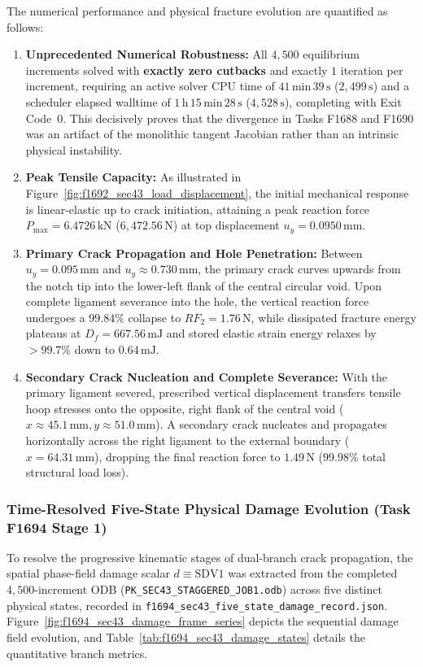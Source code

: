 The numerical performance and physical fracture evolution are quantified as follows:
\begin{enumerate}
  \item \textbf{Unprecedented Numerical Robustness:} All $4{,}500$ equilibrium increments solved with \textbf{exactly zero cutbacks} and exactly $1$ iteration per increment, requiring an active solver CPU time of $41\,\mathrm{min}\,39\,\mathrm{s}$ ($2{,}499\,\mathrm{s}$) and a scheduler elapsed walltime of $1\,\mathrm{h}\,15\,\mathrm{min}\,28\,\mathrm{s}$ ($4{,}528\,\mathrm{s}$), completing with Exit Code~0. This decisively proves that the divergence in Tasks F1688 and F1690 was an artifact of the monolithic tangent Jacobian rather than an intrinsic physical instability.
  \item \textbf{Peak Tensile Capacity:} As illustrated in Figure~\ref{fig:f1692_sec43_load_displacement}, the initial mechanical response is linear-elastic up to crack initiation, attaining a peak reaction force $P_{\max} = 6.4726\,\mathrm{kN}$ ($6{,}472.56\,\mathrm{N}$) at top displacement $u_y = 0.0950\,\mathrm{mm}$.
  \item \textbf{Primary Crack Propagation and Hole Penetration:} Between $u_y = 0.095\,\mathrm{mm}$ and $u_y \approx 0.730\,\mathrm{mm}$, the primary crack curves upwards from the notch tip into the lower-left flank of the central circular void. Upon complete ligament severance into the hole, the vertical reaction force undergoes a $99.84\%$ collapse to $RF_2 = 1.76\,\mathrm{N}$, while dissipated fracture energy plateaus at $D_f = 667.56\,\mathrm{mJ}$ and stored elastic strain energy relaxes by $>99.7\%$ down to $0.64\,\mathrm{mJ}$.
  \item \textbf{Secondary Crack Nucleation and Complete Severance:} With the primary ligament severed, prescribed vertical displacement transfers tensile hoop stresses onto the opposite, right flank of the central void ($x \approx 45.1\,\mathrm{mm}, y \approx 51.0\,\mathrm{mm}$). A secondary crack nucleates and propagates horizontally across the right ligament to the external boundary ($x = 64.31\,\mathrm{mm}$), dropping the final reaction force to $1.49\,\mathrm{N}$ ($99.98\%$ total structural load loss).
\end{enumerate}

\subsubsection{Time-Resolved Five-State Physical Damage Evolution (Task F1694 Stage 1)}
To resolve the progressive kinematic stages of dual-branch crack propagation, the spatial phase-field damage scalar $d \equiv \mathrm{SDV1}$ was extracted from the completed $4{,}500$-increment ODB (\texttt{PK\_SEC43\_STAGGERED\_JOB1.odb}) across five distinct physical states, recorded in \texttt{f1694\_sec43\_five\_state\_damage\_record.json}. Figure~\ref{fig:f1694_sec43_damage_frame_series} depicts the sequential damage field evolution, and Table~\ref{tab:f1694_sec43_damage_states} details the quantitative branch metrics.

